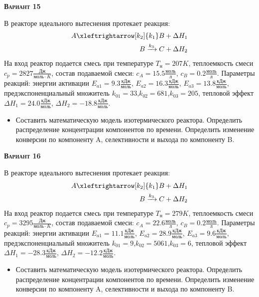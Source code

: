 \textsc{\textbf{Вариант 15}}

 В реакторе идеального вытеснения протекает реакция: \begin{equation*} \begin{aligned} A \xleftrightarrow[k_2]{k_1} B + \Delta H_1 \\ B \xrightarrow{k_3} C + \Delta H_2 \end{aligned} \end{equation*}                              На вход  реактор подается смесь при температуре $ T_{н} =  207 K$, теплоемкость смеси $c_p= 2827 \frac{Дж}{моль \cdot K}$, состав подаваемой смеси: $c_A=15.5 \frac{моль}{л}$, $c_B=0.2 \frac{моль}{л}$. Параметры реакций: энергии активации $E_{a1}= 9.3 \frac{кДж}{моль}$, $E_{a2}=16.3  \frac{кДж}{моль}$, $E_{a3}=13.8  \frac{кДж}{моль}$, предэкспоненциальный множитель $k_{01}=        33$,$k_{02}=       681$,$k_{03}=       205$, тепловой эффект $\Delta H_1= 24.0  \frac{кДж}{моль}$, $\Delta H_2=-18.8 \frac{кДж}{моль}$.\begin{itemize} \item Составить математическую модель изотермического реактора. Определить распределение концентрации компонентов по времени. Определить изменение конверсии по компоненту A, селективности и выхода по компоненту B. \end{itemize}

\textsc{\textbf{Вариант 16}}

 В реакторе идеального вытеснения протекает реакция: \begin{equation*} \begin{aligned} A \xleftrightarrow[k_2]{k_1} B + \Delta H_1 \\ B \xrightarrow{k_3} C + \Delta H_2 \end{aligned} \end{equation*}                              На вход  реактор подается смесь при температуре $ T_{н} =  279 K$, теплоемкость смеси $c_p= 3295 \frac{Дж}{моль \cdot K}$, состав подаваемой смеси: $c_A=22.6 \frac{моль}{л}$, $c_B=0.2 \frac{моль}{л}$. Параметры реакций: энергии активации $E_{a1}=11.1 \frac{кДж}{моль}$, $E_{a2}=28.9  \frac{кДж}{моль}$, $E_{a3}= 9.6  \frac{кДж}{моль}$, предэкспоненциальный множитель $k_{01}=         9$,$k_{02}=      5061$,$k_{03}=         6$, тепловой эффект $\Delta H_1= -28.3  \frac{кДж}{моль}$, $\Delta H_2=-12.2 \frac{кДж}{моль}$.\begin{itemize} \item Составить математическую модель изотермического реактора. Определить распределение концентрации компонентов по времени. Определить изменение конверсии по компоненту A, селективности и выхода по компоненту B. \end{itemize}

